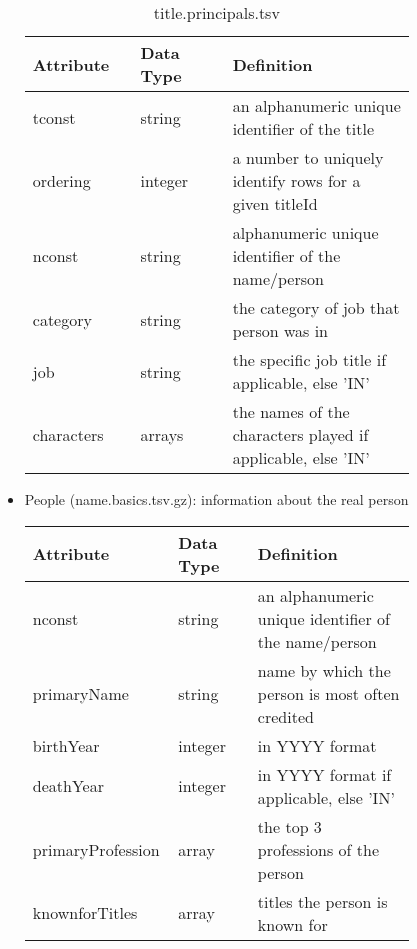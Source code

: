\documentclass[10pt,titlepage]{article}
\begin{document}
\begin{itemize}
        \begin{table}[H]
            \centering
            \begin{tabular}{p{0.2\linewidth} | p{0.2\linewidth} | p{0.4\linewidth}}
                \hline
                \textbf{Attribute} & \textbf{Data Type}  & \textbf{Definition}\\

                \hline
                tconst & string & an alphanumeric unique identifier of the title \\
                \hline
                ordering & integer & a number to uniquely identify rows for a given titleId \\
                \hline
                nconst & string & alphanumeric unique identifier of the name/person \\
                \hline
                category & string & the category of job that person was in \\
                \hline
                job & string & the specific job title if applicable, else 'IN' \\
                \hline
                characters & arrays & the names of the characters played if applicable, else 'IN' \\

                \hline
            \end{tabular}
            \caption{title.principals.tsv}
            \label{tab:imdb_principals}
        \end{table}

    \item People (name.basics.tsv.gz): information about the real person

        \begin{table}[H]
            \centering
            \begin{tabular}{p{0.2\linewidth} | p{0.2\linewidth} | p{0.4\linewidth}}
                \hline
                \textbf{Attribute} & \textbf{Data Type}  & \textbf{Definition}\\


                \hline
                nconst & string & an alphanumeric unique identifier of the name/person \\
                \hline
                primaryName & string & name by which the person is most often credited \\
                \hline
                birthYear & integer & in YYYY format \\
                \hline
                deathYear & integer & in YYYY format if applicable, else 'IN' \\
                \hline
                primaryProfession & array & the top 3 professions of the person \\
                \hline
                knownforTitles & array & titles the person is known for \\
                \hline


\end{tabular}
\end{table}
\end{itemize}
\end{document}
